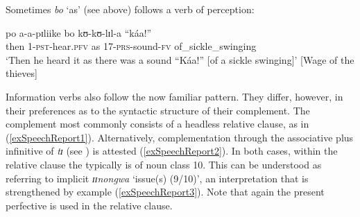 Sometimes \textit{bo} \lq as' (see  above) follows a verb of perception:

\begin{exe}
\ex \label{exPRSparadigmsInComplementBo} \gll po a-a-pɪliike bo kʊ-kʊ-lɪl-a ``káa!''\\
then 1-\textsc{pst}-hear.\textsc{pfv} as 17-\textsc{prs}-sound-\textsc{fv} \phantom{\lq\lq}of\_sickle\_swinging\\
\glt `Then he heard it as there was a sound ``Káa!'' [of a sickle swinging]' [Wage of the thieves]
\end{exe}

Information verbs also follow the now familiar pattern. They differ, however, in their preferences as to the syntactic structure of their complement. The complement most commonly consists of a headless relative clause, as in (\ref{exSpeechReport1}). Alternatively, complementation through the associative plus infinitive of \textit{tɪ} (see ) is attested (\ref{exSpeechReport2}). In both cases, within the relative clause the  typically is of noun class 10. This can be understood as referring to implicit \textit{ɪɪnongwa} \lq issue(s) (9/10)', an interpretation that is strengthened by example (\ref{exSpeechReport3}). Note that again the present perfective is used in the relative clause.

